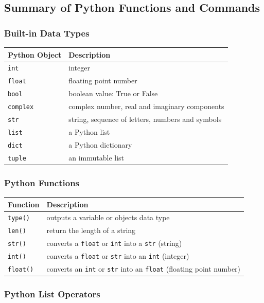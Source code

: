 \documentclass{book}
\begin{document}
    




    
        \subsection{Summary of Python Functions and
Commands}\label{summary-of-python-functions-and-commands}
    




    
        \subsubsection{Built-in Data Types}\label{built-in-data-types}

\begin{longtable}[]{@{}ll@{}}
\toprule
Python Object & Description\tabularnewline
\midrule
\endhead
\lstinline!int! & integer\tabularnewline
\lstinline!float! & floating point number\tabularnewline
\lstinline!bool! & boolean value: True or False\tabularnewline
\lstinline!complex! & complex number, real and imaginary
components\tabularnewline
\lstinline!str! & string, sequence of letters, numbers and
symbols\tabularnewline
\lstinline!list! & a Python list\tabularnewline
\lstinline!dict! & a Python dictionary\tabularnewline
\lstinline!tuple! & an immutable list\tabularnewline
\bottomrule
\end{longtable}

\subsubsection{Python Functions}\label{python-functions}

\begin{longtable}[]{@{}ll@{}}
\toprule
Function & Description\tabularnewline
\midrule
\endhead
\lstinline!type()! & outputs a variable or objects data
type\tabularnewline
\lstinline!len()! & return the length of a string\tabularnewline
\lstinline!str()! & converts a \lstinline!float! or \lstinline!int! into
a \lstinline!str! (string)\tabularnewline
\lstinline!int()! & converts a \lstinline!float! or \lstinline!str! into
an \lstinline!int! (integer)\tabularnewline
\lstinline!float()! & converts an \lstinline!int! or \lstinline!str!
into an \lstinline!float! (floating point number)\tabularnewline
\bottomrule
\end{longtable}

\subsubsection{Python List Operators}\label{python-list-operators}
\end{document}
